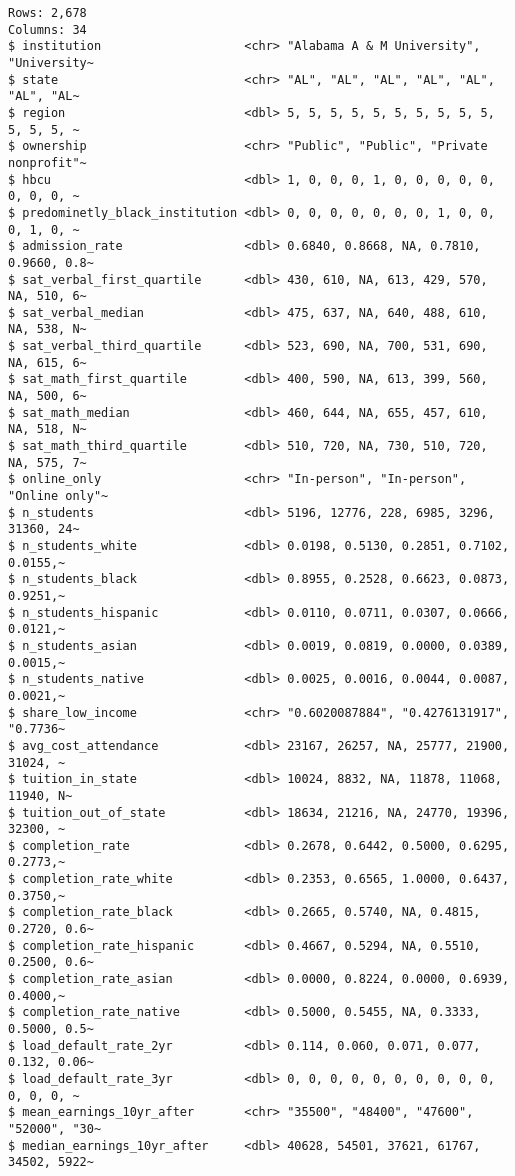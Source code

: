 \documentclass[12pt]{article}
\begin{document}
\begin{verbatim}
Rows: 2,678
Columns: 34
$ institution                    <chr> "Alabama A & M University", "University~
$ state                          <chr> "AL", "AL", "AL", "AL", "AL", "AL", "AL~
$ region                         <dbl> 5, 5, 5, 5, 5, 5, 5, 5, 5, 5, 5, 5, 5, ~
$ ownership                      <chr> "Public", "Public", "Private nonprofit"~
$ hbcu                           <dbl> 1, 0, 0, 0, 1, 0, 0, 0, 0, 0, 0, 0, 0, ~
$ predominetly_black_institution <dbl> 0, 0, 0, 0, 0, 0, 0, 1, 0, 0, 0, 1, 0, ~
$ admission_rate                 <dbl> 0.6840, 0.8668, NA, 0.7810, 0.9660, 0.8~
$ sat_verbal_first_quartile      <dbl> 430, 610, NA, 613, 429, 570, NA, 510, 6~
$ sat_verbal_median              <dbl> 475, 637, NA, 640, 488, 610, NA, 538, N~
$ sat_verbal_third_quartile      <dbl> 523, 690, NA, 700, 531, 690, NA, 615, 6~
$ sat_math_first_quartile        <dbl> 400, 590, NA, 613, 399, 560, NA, 500, 6~
$ sat_math_median                <dbl> 460, 644, NA, 655, 457, 610, NA, 518, N~
$ sat_math_third_quartile        <dbl> 510, 720, NA, 730, 510, 720, NA, 575, 7~
$ online_only                    <chr> "In-person", "In-person", "Online only"~
$ n_students                     <dbl> 5196, 12776, 228, 6985, 3296, 31360, 24~
$ n_students_white               <dbl> 0.0198, 0.5130, 0.2851, 0.7102, 0.0155,~
$ n_students_black               <dbl> 0.8955, 0.2528, 0.6623, 0.0873, 0.9251,~
$ n_students_hispanic            <dbl> 0.0110, 0.0711, 0.0307, 0.0666, 0.0121,~
$ n_students_asian               <dbl> 0.0019, 0.0819, 0.0000, 0.0389, 0.0015,~
$ n_students_native              <dbl> 0.0025, 0.0016, 0.0044, 0.0087, 0.0021,~
$ share_low_income               <chr> "0.6020087884", "0.4276131917", "0.7736~
$ avg_cost_attendance            <dbl> 23167, 26257, NA, 25777, 21900, 31024, ~
$ tuition_in_state               <dbl> 10024, 8832, NA, 11878, 11068, 11940, N~
$ tuition_out_of_state           <dbl> 18634, 21216, NA, 24770, 19396, 32300, ~
$ completion_rate                <dbl> 0.2678, 0.6442, 0.5000, 0.6295, 0.2773,~
$ completion_rate_white          <dbl> 0.2353, 0.6565, 1.0000, 0.6437, 0.3750,~
$ completion_rate_black          <dbl> 0.2665, 0.5740, NA, 0.4815, 0.2720, 0.6~
$ completion_rate_hispanic       <dbl> 0.4667, 0.5294, NA, 0.5510, 0.2500, 0.6~
$ completion_rate_asian          <dbl> 0.0000, 0.8224, 0.0000, 0.6939, 0.4000,~
$ completion_rate_native         <dbl> 0.5000, 0.5455, NA, 0.3333, 0.5000, 0.5~
$ load_default_rate_2yr          <dbl> 0.114, 0.060, 0.071, 0.077, 0.132, 0.06~
$ load_default_rate_3yr          <dbl> 0, 0, 0, 0, 0, 0, 0, 0, 0, 0, 0, 0, 0, ~
$ mean_earnings_10yr_after       <chr> "35500", "48400", "47600", "52000", "30~
$ median_earnings_10yr_after     <dbl> 40628, 54501, 37621, 61767, 34502, 5922~
\end{verbatim}
\end{document}

